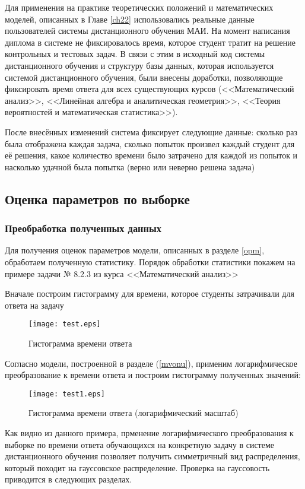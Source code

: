 Для применения на практике теоретических положений и математических моделей, описанных в Главе \ref{ch22} использовались реальные данные пользователей системы дистанцион\-ного обучения МАИ. На момент написания диплома в системе не фиксировалось время, которое студент тратит на решение конт\-рольных и тестовых задач. В связи с этим в исходный код системы дистан\-ционного обучения и структуру базы данных, которая исполь\-зуется системой дистанционного обучения, были внесены доработки, позволяющие фикси\-ровать время ответа для всех существующих курсов (<<Математический ана\-лиз>>, <<Линейная алгебра и аналитическая геометрия>>, <<Теория вероятностей и математическая статистика>>).

После внесённых изменений система фиксирует следующие данные: сколь\-ко раз была отображена каждая задача, сколько попыток произвел каждый студент для её решения, какое количество времени было затрачено для каждой из попыток и насколько удачной была попытка (верно или неверно решена задача)

\subsection{Оценка параметров по выборке}

\subsubsection{Преобработка полученных данных}

Для получения оценок параметров модели, описанных в разделе \ref{opm}, обработаем полученную статистику. Порядок обработки статистики покажем на примере задачи № 8.2.3 из курса <<Математический анализ>>

\newpage
Вначале построим гистограмму для времени, которое студенты затра\-чивали для ответа на задачу
\begin{figure}[ht!]
\centering \texttt{[image: test.eps]}
\caption{Гистограмма времени ответа}
\end{figure}

Согласно модели, построенной в разделе (\ref{mvonu}), применим логарифми\-ческое преобразование к времени ответа и построим гистограмму полученных значений:
\begin{figure}[ht!]
\centering \texttt{[image: test1.eps]}
\caption{Гистограмма времени ответа (логарифмический масштаб)}
\end{figure}

Как видно из данного примера, прменение логарифмического преобра\-зования к выборке по времени ответа обучающихся на конкретную задачу в системе дистанционного обучения позволяет получить симметричный вид распределения, который походит на гауссовское распределение. Проверка на гауссовость приводится в следующих разделах.

